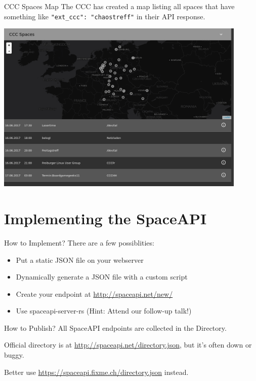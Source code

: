 \begin{frame}{CCC Spaces Map}
	The CCC has created a map listing all spaces that have something like
	\texttt{"ext\_ccc": "chaostreff"} in their API response.

	\vspace{1em}
	\centerline{
		\includegraphics[width=0.9\textwidth]{what_is_the_spaceapi/app-ccc.png}
	}

\end{frame}



\section{Implementing the SpaceAPI}

\begin{frame}{How to Implement?}
	There are a few possiblities:
	\pause
	\begin{itemize}
		\item Put a static JSON file on your webserver	
		\pause
		\item Dynamically generate a JSON file with a custom script
		\pause
		\item Create your endpoint at \url{http://spaceapi.net/new/}
		\pause
		\item Use spaceapi-server-rs (Hint: Attend our follow-up talk!)
	\end{itemize}
\end{frame}

\begin{frame}{How to Publish?}
	All SpaceAPI endpoints are collected in the Directory.

	Official directory is at \url{http://spaceapi.net/directory.json}, but it's
	often down or buggy.

	Better use \url{https://spaceapi.fixme.ch/directory.json} instead.
\end{frame}

